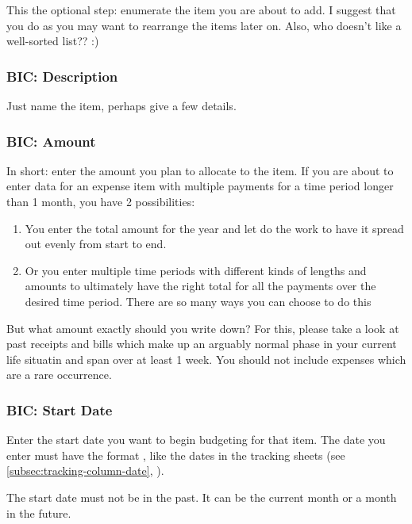 This the optional step: enumerate the item you are about to add.
I suggest that you do as you may want to rearrange the items later on.
Also, who doesn't like a well-sorted list?? :)

\subsubsection{BIC: Description}
\label{subsubsec:bic-description}

Just name the item, perhaps give a few details.

\subsubsection{BIC: Amount}
\label{subsubsec:bic-amount}

In short: enter the amount you plan to allocate to the item.
If you are about to enter data for an expense item with multiple payments for a time period longer than 1 month, you have 2 possibilities:
\begin{enumerate}
	\item You enter the total amount for the year and let \tfn do the work to have it spread out evenly from start to end.
	\item Or you enter multiple time periods with different kinds of lengths and amounts to ultimately have the right total for all the payments over the desired time period.
	There are so many ways you can choose to do this
\end{enumerate}

But what amount exactly should you write down?
For this, please take a look at past receipts and bills which make up an arguably normal phase in your current life situatin and span over at least 1 week.
You should not include expenses which are a rare occurrence.

\subsubsection{BIC: Start Date}
\label{subsubsec:bic-start-date}

Enter the start date you want to begin budgeting for that item.
The date you enter must have the format , like the dates in the tracking sheets (see \autoref{subsec:tracking-column-date}, ).

\begin{specialnote}
	The start date must not be in the past.
	It can be the current month or a month in the future.
\end{specialnote}

